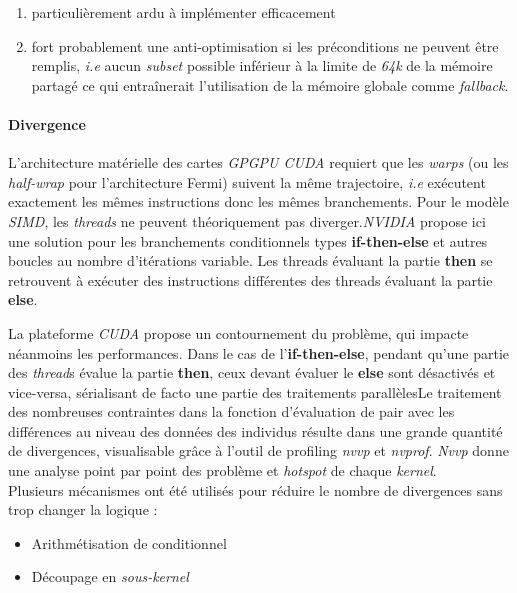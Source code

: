 \documentclass[french, 11pt]{memoir}
\begin{document}
\begin{enumerate}
\def\labelenumi{\arabic{enumi})}
\item
  particulièrement ardu à implémenter efficacement
\item
  fort probablement une anti-optimisation si les préconditions ne
  peuvent être remplis, \textit{i.e} aucun \emph{subset }possible inférieur à la
  limite de \textit{64k} de la mémoire partagé ce qui entraînerait
  l'utilisation de la mémoire globale comme \emph{fallback}.
\end{enumerate}

\paragraph{Divergence}\label{divergence}

L'architecture matérielle des cartes \emph{GPGPU CUDA }requiert que les
\textit{warps} (ou les \emph{half-wrap} pour l'architecture Fermi) suivent la
même trajectoire, \textit{i.e} exécutent exactement les mêmes instructions donc
les mêmes branchements. Pour le modèle \emph{SIMD}, les \emph{threads}
ne peuvent théoriquement pas diverger.\emph{NVIDIA} propose ici une
solution pour les branchements conditionnels types \textbf{if-then-else} et
autres boucles au nombre d'itérations variable. Les threads évaluant la
partie \textbf{then} se retrouvent à exécuter des instructions
différentes des threads évaluant la partie \textbf{else}. 

\bigskip
La plateforme \emph{CUDA} propose un contournement du problème, qui
impacte néanmoins les performances. Dans le cas de
l'\textbf{if-then-else}, pendant qu'une partie des \emph{thread}s évalue
la partie \textbf{then}, ceux devant évaluer le \textbf{else} sont
désactivés et vice-versa, sérialisant de facto une partie des
traitements parallèlesLe traitement des nombreuses contraintes dans la
fonction d'évaluation de pair avec les différences au niveau des données
des individus résulte dans une grande quantité de divergences,
visualisable grâce à l'outil de profiling \emph{nvvp} et \emph{nvprof}.
\emph{Nvvp} donne une analyse point par point des problème et
\emph{hotspot} de chaque \emph{kernel}. \\
Plusieurs mécanismes ont été utilisés pour réduire le nombre de
divergences sans trop changer la logique :

\begin{itemize}
\item
  Arithmétisation de conditionnel
\item
  Découpage en \emph{sous-kernel}
\end{itemize}
\end{document}
